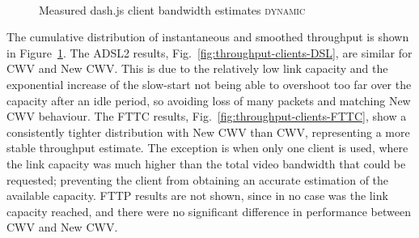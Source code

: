 \documentclass[10pt, acmlarge]{acmart}
\begin{document}
\begin{figure}[t!]
  \centering
  \\
  \caption{Measured dash.js client bandwidth estimates \textsc{dynamic}}
  \label{fig:throughput-clients}
\end{figure}

The cumulative distribution of instantaneous and smoothed throughput is shown in 
Figure~\ref{fig:throughput-clients}. 
%
The ADSL2 results, Fig.~\ref{fig:throughput-clients-DSL}, are similar for CWV and New CWV.
This is due to the relatively low link capacity and the exponential increase of the 
slow-start not being able to overshoot too far over the capacity after an idle period,
so avoiding loss of many packets and matching New CWV behaviour.
The FTTC results, Fig.~\ref{fig:throughput-clients-FTTC}, show a consistently tighter 
distribution with New CWV than CWV, representing a more stable throughput estimate. 
The exception is when only one client is used, where the link capacity was much 
higher than the total video bandwidth that could be requested; preventing the 
client from obtaining an accurate estimation of the available capacity.
%
FTTP results are not shown, since in no case was the link capacity reached,
 and there were no significant difference in performance between CWV and New CWV.
\end{document}
